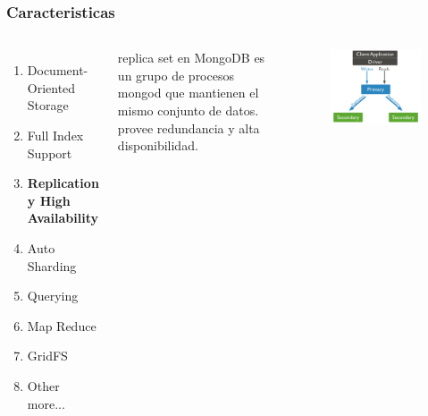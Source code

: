 \documentclass{beamer}
\begin{document}
\begin{frame}
\frametitle{Caracteristicas}
\begin{columns}[c] %

\begin{enumerate}
\item Document-Oriented Storage
\item Full Index Support
\item \textbf{Replication y High Availability}
\item Auto Sharding
\item Querying
\item Map Reduce
\item GridFS
\item Other more...
\end{enumerate}

replica set en MongoDB es un grupo de procesos mongod que mantienen el mismo conjunto de datos. provee redundancia y alta disponibilidad.
\begin{figure}
\includegraphics[width=0.6\linewidth]{replica-set-read-write-operations-primary.png}
\end{figure}
\end{columns}
\end{frame}
\end{document}
